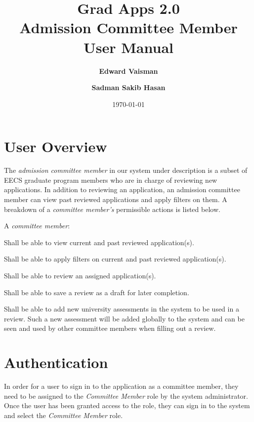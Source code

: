 \documentclass[fontsize=12pt,paper=letter,twoside]{scrartcl}
\author{\textbf{Edward Vaisman}
\and \textbf{Sadman Sakib Hasan}
}
\date{\today} %
\begin{document}
\title{Grad Apps 2.0 \\ Admission Committee Member User Manual}
\maketitle

\newpage

\tableofcontents

\newpage



\clearpage
\section{User Overview}

The \emph{admission committee member} in our system under description is a subset of EECS graduate program members who are in charge of reviewing new applications. In addition to reviewing an application, an admission committee member can view past reviewed applications and apply filters on them. A breakdown of a \emph{committee member's} permissible actions is listed below.

\smallskip
\noindent A \emph{committee member}:

\begin{mylist}
\item Shall be able to view current and past reviewed application(s).
\item Shall be able to apply filters on current and past reviewed application(s).
\item Shall be able to review an assigned application(s).
\item Shall be able to save a review as a draft for later completion.
\item Shall be able to add new university assessments in the system to be used in a review. Such a new assessment will be added globally to the system and can be seen and used by other committee members when filling out a review.
\end{mylist}

\section{Authentication}

In order for a user to sign in to the application as a committee member, they need to be assigned to the \emph{Committee Member} role by the system administrator. Once the user has been granted access to the role, they can sign in to the system and select the \emph{Committee Member} role.
\end{document}
